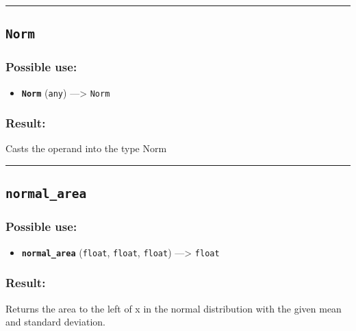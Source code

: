 \documentclass[]{book}
\providecommand{\tightlist}{%
  \setlength{\itemsep}{0pt}\setlength{\parskip}{0pt}}
\theoremstyle{definition}
\theoremstyle{definition}
\theoremstyle{definition}
\theoremstyle{remark}
\begin{document}
\begin{center}\rule{0.5\linewidth}{\linethickness}\end{center}

\subsection{\texorpdfstring{\texttt{Norm}}{Norm}}\label{norm-1}

\subsubsection{Possible use:}\label{possible-use-376}

\begin{itemize}
\tightlist
\item
  \textbf{\texttt{Norm}} (\texttt{any}) ---\textgreater{} \texttt{Norm}
\end{itemize}

\subsubsection{Result:}\label{result-362}

Casts the operand into the type Norm

\begin{center}\rule{0.5\linewidth}{\linethickness}\end{center}

\subsection{\texorpdfstring{\texttt{normal\_area}}{normal\_area}}\label{normal_area}

\subsubsection{Possible use:}\label{possible-use-377}

\begin{itemize}
\tightlist
\item
  \textbf{\texttt{normal\_area}} (\texttt{float}, \texttt{float},
  \texttt{float}) ---\textgreater{} \texttt{float}
\end{itemize}

\subsubsection{Result:}\label{result-363}

Returns the area to the left of x in the normal distribution with the
given mean and standard deviation.
\end{document}
